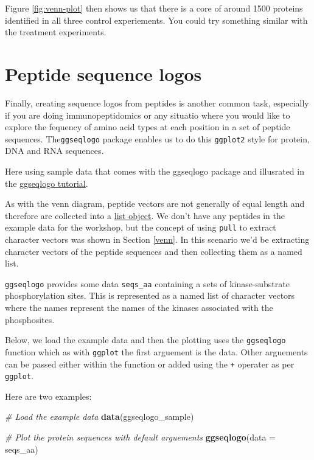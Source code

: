 \documentclass[12pt,]{book}
\newenvironment{Shaded}{\begin{snugshade}}{\end{snugshade}}
\newcommand{\CommentTok}[1]{\textcolor[rgb]{0.56,0.35,0.01}{\textit{#1}}}
\newcommand{\DataTypeTok}[1]{\textcolor[rgb]{0.13,0.29,0.53}{#1}}
\newcommand{\KeywordTok}[1]{\textcolor[rgb]{0.13,0.29,0.53}{\textbf{#1}}}
\newcommand{\NormalTok}[1]{#1}
\begin{document}
Figure \ref{fig:venn-plot} then shows us that there is a core of around 1500
proteins identified in all three control experiements. You could try something
similar with the treatment experiments.

\hypertarget{peptide-sequence-logos}{%
\section{Peptide sequence logos}\label{peptide-sequence-logos}}

Finally, creating sequence logos from peptides is another common task, especially
if you are doing immunopeptidomics or any situatio where you would like to explore
the fequency of amino acid types at each position in a set of peptide sequences.
The\texttt{ggseqlogo} package enables us to do this \texttt{ggplot2} style \citep{R-ggseqlogo} for
protein, DNA and RNA sequences.

Here using sample data that comes with the ggseqlogo package and illusrated
in the \href{https://omarwagih.github.io/ggseqlogo/}{ggseqlogo tutorial}.

As with the venn diagram, peptide vectors are not generally of equal length
and therefore are collected into a \protect\hyperlink{lists}{list object}. We don't have any
peptides in the example data for the workshop, but the concept of using \texttt{pull}
to extract character vectors was shown in Section \ref{venn}. In this
scenario we'd be extracting character vectors of the peptide sequences and then
collecting them as a named list.

\texttt{ggseqlogo} provides some data \texttt{seqs\_aa} containing a sets of kinase-substrate
phosphorylation sites. This is represented as a named list of character vectors
where the names represent the names of the kinases associated with the
phosphosites.

Below, we load the example data and then the plotting uses the \texttt{ggseqlogo} function
which as with \texttt{ggplot} the first arguement is the data. Other arguements can
be passed either within the function or added using the \texttt{+} operater as per
\texttt{ggplot}.

Here are two examples:

\begin{Shaded}
\begin{Highlighting}[]
\CommentTok{# Load the example data}
\KeywordTok{data}\NormalTok{(ggseqlogo_sample)}

\CommentTok{# Plot the protein sequences with default arguements }
\KeywordTok{ggseqlogo}\NormalTok{(}\DataTypeTok{data =}\NormalTok{ seqs_aa)}
\end{Highlighting}
\end{Shaded}
\end{document}
